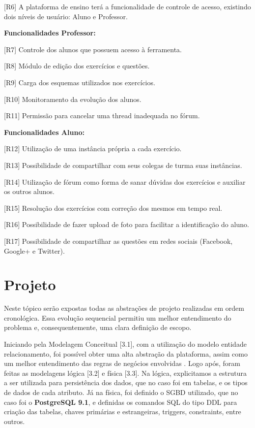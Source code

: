 \documentclass[graduacao,brazil]{ThesisPUC}
\begin{document}
[R6] A plataforma de ensino ter\'{a} a funcionalidade de controle de acesso, existindo dois n\'{i}veis de usu\'{a}rio:
Aluno e Professor.

\textbf{Funcionalidades Professor:}

[R7] Controle dos alunos que possuem acesso \`{a} ferramenta.

[R8] M\'{o}dulo de edi\c{c}\~{a}o dos exerc\'{i}cios e quest\~{o}es.

[R9] Carga dos esquemas utilizados nos exerc\'{i}cios.

[R10] Monitoramento da evolu\c{c}\~{a}o dos alunos.

[R11] Permiss\~{a}o para cancelar uma thread inadequada no f\'{o}rum.

\textbf{Funcionalidades Aluno:}

[R12] Utiliza\c{c}\~{a}o de uma inst\^{a}ncia pr\'{o}pria a cada exerc\'{i}cio.

[R13] Possibilidade de compartilhar com seus colegas de turma suas inst\^{a}ncias.

[R14] Utiliza\c{c}\~{a}o de f\'{o}rum como forma de sanar d\'{u}vidas dos exerc\'{i}cios e auxiliar os outros alunos.

[R15] Resolu\c{c}\~{a}o dos exerc\'{i}cios com corre\c{c}\~{a}o dos mesmos em tempo real.

[R16] Possibilidade de fazer upload de foto para facilitar a identifica\c{c}\~{a}o do aluno.

[R17] Possibilidade de compartilhar as quest\~{o}es em redes sociais (Facebook, Google+ e Twitter).


\chapter{Projeto}

Neste t\'{o}pico ser\~{a}o expostas todas as abstra\c{c}\~{o}es de projeto realizadas em ordem
cronol\'{o}gica. Essa evolu\c{c}\~{a}o sequencial permitiu um melhor entendimento do problema e,
consequentemente, uma clara defini\c{c}\~{a}o de escopo.

Iniciando pela Modelagem Conceitual [3.1], com a utiliza\c{c}\~{a}o do modelo entidade
relacionamento, foi poss\'{i}vel obter uma alta abstra\c{c}\~{a}o da plataforma, assim como um melhor
entendimento das regras de neg\'{o}cios envolvidas \cite{Heuser09}. Logo ap\'{o}s, foram feitas as modelagens l\'{o}gica
[3.2] e f\'{i}sica [3.3]. Na l\'{o}gica, explicitamos a estrutura a ser utilizada para persist\^{e}ncia dos dados,
que no caso foi em tabelas, e os tipos de dados de cada atributo. J\'{a} na f\'{i}sica, foi definido o
SGBD utilizado, que no caso foi o \textbf{PostgreSQL 9.1}, e definidas os comandos SQL do tipo DDL
para criação das tabelas, chaves primárias e estrangeiras, triggers, constraints, entre outros.
\end{document}
